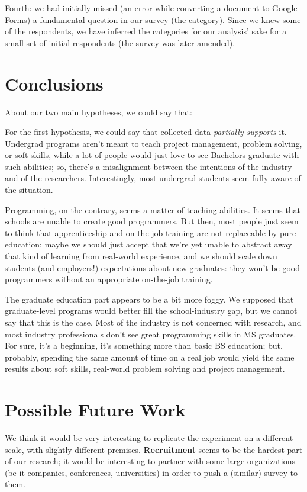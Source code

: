 \documentclass{sigchi}
\begin{document}
Fourth: we had initially missed (an error while converting a document to Google Forms) a fundamental question in our survey (the category). Since we knew some of the respondents, we have inferred the categories for our analysis' sake for a small set of initial respondents (the survey was later amended).

\section{Conclusions}
About our two main hypotheses, we could say that:

For the first hypothesis, we could say that collected data \textit{partially supports} it. Undergrad programs aren't meant to teach project management, problem solving, or soft skills, while a lot of people would just love to see Bachelors graduate with such abilities; so, there's a misalignment between the intentions of the industry and of the researchers. Interestingly, most undergrad students seem fully aware of the situation.

Programming, on the contrary, seems a matter of teaching abilities. It seems that schools are unable to create good programmers. But then, most people just seem to think that apprenticeship and on-the-job training are not replaceable by pure education; maybe we should just accept that we're yet unable to abstract away that kind of learning from real-world experience, and we should scale down students (and employers!) expectations about new graduates: they won't be good programmers without an appropriate on-the-job training.

The graduate education part appears to be a bit more foggy. We supposed that graduate-level programs would better fill the school-industry gap, but we cannot say that this is the case. Most of the industry is not concerned with research, and most industry professionals don't see great programming skills in MS graduates. For sure, it's a beginning, it's something more than basic BS education; but, probably, spending the same amount of time on a real job would yield the same results about soft skills, real-world problem solving and project management.

\section{Possible Future Work}
We think it would be very interesting to replicate the experiment on a different scale, with slightly different premises. \textbf{Recruitment} seems to be the hardest part of our research; it would be interesting to partner with some large organizations (be it companies, conferences, universities) in order to push a (similar) survey to them.
\end{document}
